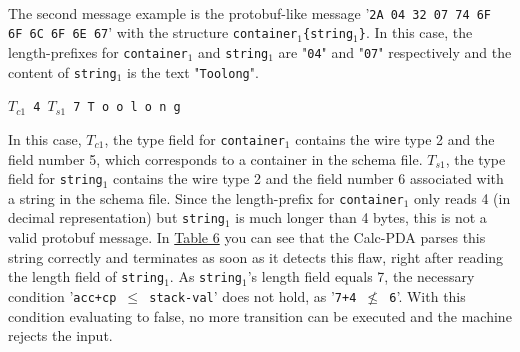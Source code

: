 \\The second message example is the protobuf-like message '\texttt{2A 04 32 07 74 6F 6F 6C 6F 6E 67}' with the structure \texttt{container$_1$\{string$_1$\}}. In this case, the length-prefixes for \texttt{container$_1$} and \texttt{string$_1$} are "\texttt{04}" and "\texttt{07}" respectively and the content of \texttt{string$_1$} is the text "\texttt{Toolong}". 
\begin{center}
    \texttt{$T_{c1}$ 4 $T_{s1}$ 7 T o o l o n g}
\end{center}
In this case, $T_{c1}$, the type field for \texttt{container$_1$} contains the wire type 2 and the field number 5, which corresponds to a container in the schema file. $T_{s1}$, the type field for \texttt{string$_1$} contains the wire type 2 and the field number 6 associated with a string in the schema file.
Since the length-prefix for \texttt{container$_1$} only reads 4 (in decimal representation) but \texttt{string$_1$} is much longer than 4 bytes, this is not a valid protobuf message. In \hyperref[tab:tab6-protobuf-2-Calc-pda-state-sequence]{Table 6} you can see that the Calc-PDA parses this string correctly and terminates as soon as it detects this flaw, right after reading the length field of \texttt{string$_1$}. As \texttt{string$_1$}'s length field equals 7, the necessary condition '\texttt{acc+cp $\leq$ stack-val}' does not hold, as '\texttt{7+4 $\nleq$ 6}'. With this condition evaluating to false, no more transition can be executed and the machine rejects the input.
